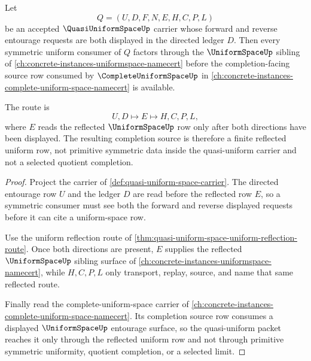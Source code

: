 \begin{theorem}
\label{thm:quasi-uniform-space-uniform-space-forward-link}
Let
$$
Q=(U,D,F,N,E,H,C,P,L)
$$
be an accepted $\QuasiUniformSpaceUp$ carrier whose forward and reverse entourage requests are both displayed in the directed ledger $D$. Then every symmetric uniform consumer of $Q$ factors through the $\UniformSpaceUp$ sibling of \autoref{ch:concrete-instances-uniformspace-namecert} before the completion-facing source row consumed by $\CompleteUniformSpaceUp$ in \autoref{ch:concrete-instances-complete-uniform-space-namecert} is available.

The route is
$$
U,D \longmapsto E \longmapsto H,C,P,L,
$$
where $E$ reads the reflected $\UniformSpaceUp$ row only after both directions have been displayed. The resulting completion source is therefore a finite reflected uniform row, not primitive symmetric data inside the quasi-uniform carrier and not a selected quotient completion.
\end{theorem}
\begin{proof}
Project the carrier of \autoref{def:quasi-uniform-space-carrier}. The directed entourage row $U$ and the ledger $D$ are read before the reflected row $E$, so a symmetric consumer must see both the forward and reverse displayed requests before it can cite a uniform-space row.

Use the uniform reflection route of \autoref{thm:quasi-uniform-space-uniform-reflection-route}. Once both directions are present, $E$ supplies the reflected $\UniformSpaceUp$ sibling surface of \autoref{ch:concrete-instances-uniformspace-namecert}, while $H,C,P,L$ only transport, replay, source, and name that same reflected route.

Finally read the complete-uniform-space carrier of \autoref{ch:concrete-instances-complete-uniform-space-namecert}. Its completion source row consumes a displayed $\UniformSpaceUp$ entourage surface, so the quasi-uniform packet reaches it only through the reflected uniform row and not through primitive symmetric uniformity, quotient completion, or a selected limit.
\end{proof}
